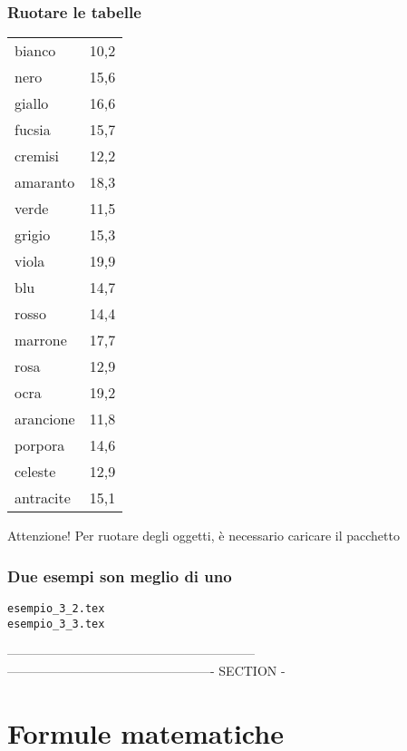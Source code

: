 \begin{frame}
  \frametitle{Ruotare le tabelle}
	\begin{LaTeXoutput}
		\begin{sideways}
		\begin{tabular}{lr}\\\hline
		bianco 		& 10,2 \\
		nero   		& 15,6 \\
		giallo		& 16,6 \\
		fucsia		& 15,7 \\
		cremisi		& 12,2 \\
		amaranto	& 18,3 \\
		verde		& 11,5 \\
		grigio		& 15,3 \\
		viola		& 19,9 \\
		blu		& 14,7 \\
		rosso		& 14,4 \\
		marrone		& 17,7 \\
		rosa		& 12,9 \\
		ocra		& 19,2 \\
		arancione	& 11,8 \\
		porpora		& 14,6 \\
		celeste		& 12,9 \\
		antracite	& 15,1 \\
		\hline
		\end{tabular}
		\end{sideways}
	\end{LaTeXoutput}
	\begin{block}{Attenzione!}
		Per ruotare degli oggetti, \`e necessario caricare il pacchetto 
	\end{block}
\end{frame}
\begin{frame}
  \frametitle{Due esempi son meglio di uno}
	\begin{center}
		\alert{\texttt{esempio\_3\_2.tex}}\\
		\alert{\texttt{esempio\_3\_3.tex}}
	\end{center}
\end{frame}
-----------------------------------------------------------
------------------------------------------------- SECTION -
\section{Formule matematiche}
